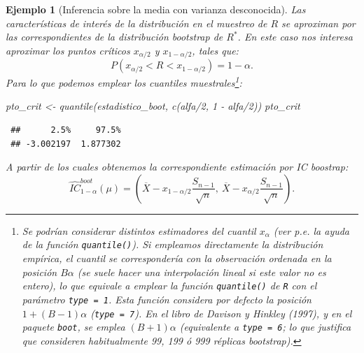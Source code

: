 \documentclass[
]{book}
\newenvironment{Shaded}{\begin{snugshade}}{\end{snugshade}}
\newcommand{\DecValTok}[1]{\textcolor[rgb]{0.00,0.00,0.81}{#1}}
\newcommand{\FunctionTok}[1]{\textcolor[rgb]{0.00,0.00,0.00}{#1}}
\newcommand{\NormalTok}[1]{#1}
\newcommand{\OtherTok}[1]{\textcolor[rgb]{0.56,0.35,0.01}{#1}}
\newcommand{\SpecialCharTok}[1]{\textcolor[rgb]{0.00,0.00,0.00}{#1}}
\theoremstyle{break}
\newtheorem{example}{Ejemplo}[chapter]
\theoremstyle{nonumberplain}
\begin{document}
\begin{example}[Inferencia sobre la media con varianza desconocida]
Las características de interés de la distribución en el muestreo de \(R\)
se aproximan por las correspondientes de la distribución bootstrap de \(R^{\ast}\).
En este caso nos interesa aproximar los puntos críticos \(x_{\alpha /2}\) y
\(x_{1-\alpha /2}\), tales que:
\[P\left( x_{\alpha /2} < R < x_{1-\alpha /2} \right) = 1-\alpha.\]
Para lo que podemos emplear los cuantiles muestrales\footnote{
  Se podrían considerar distintos estimadores del cuantil \(x_{\alpha}\)
  (ver p.e. la ayuda de la función \texttt{quantile()}).
  Si empleamos directamente la distribución empírica, el cuantil se
  correspondería con la observación ordenada en la posición \(B \alpha\)
  (se suele hacer una interpolación lineal si este valor no es entero),
  lo que equivale a emplear la función \texttt{quantile()} de \texttt{R} con el parámetro
  \texttt{type\ =\ 1}. Esta función considera por defecto la posición
  \(1 + (B - 1) \alpha\) (\texttt{type\ =\ 7}).
  En el libro de Davison y Hinkley (1997), y en el paquete \texttt{boot}, se emplea \((B + 1) \alpha\) (equivalente a \texttt{type\ =\ 6}; lo que justifica que
  consideren habitualmente 99, 199 ó 999 réplicas bootstrap).}:

\begin{Shaded}
\begin{Highlighting}[]
\NormalTok{pto\_crit }\OtherTok{\textless{}{-}} \FunctionTok{quantile}\NormalTok{(estadistico\_boot, }\FunctionTok{c}\NormalTok{(alfa}\SpecialCharTok{/}\DecValTok{2}\NormalTok{, }\DecValTok{1} \SpecialCharTok{{-}}\NormalTok{ alfa}\SpecialCharTok{/}\DecValTok{2}\NormalTok{))}
\NormalTok{pto\_crit}
\end{Highlighting}
\end{Shaded}

\begin{verbatim}
 ##      2.5%     97.5% 
 ## -3.002197  1.877302
\end{verbatim}

A partir de los cuales obtenemos la correspondiente estimación por IC boostrap:
\[\hat{IC}^{boot}_{1-\alpha}\left(  \mu\right)  = 
\left(  \overline{X}-x_{1-\alpha/2}\dfrac{S_{n-1}}{\sqrt{n}},\ \overline{X} 
- x_{\alpha/2}\dfrac{S_{n-1}}{\sqrt{n}} \right).\]


\end{example}
\end{document}
